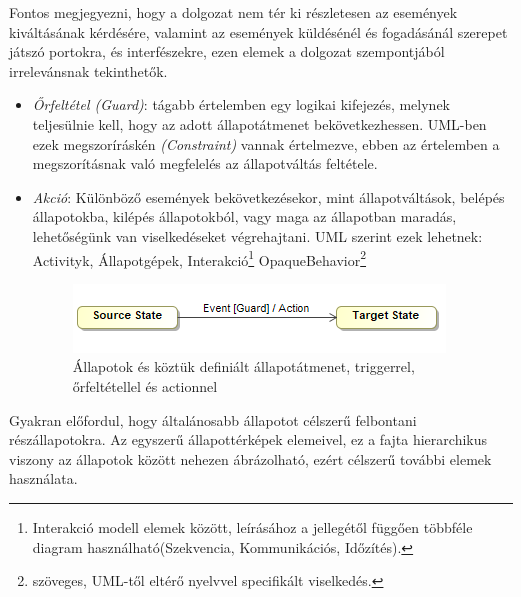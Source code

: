 Fontos megjegyezni, hogy a dolgozat nem tér ki részletesen az események kiváltásának kérdésére, valamint az események küldésénél és fogadásánál szerepet játszó portokra, és interfészekre, ezen elemek a dolgozat szempontjából irrelevánsnak tekinthetők.
\begin{itemize}
	\item\label{sec:guard} \emph{Őrfeltétel (Guard)}: tágabb értelemben egy logikai kifejezés, melynek teljesülnie kell, hogy az adott állapotátmenet bekövetkezhessen. UML-ben ezek megszoríráskén \emph{(Constraint)} vannak értelmezve, ebben az értelemben a megszorításnak való megfelelés az állapotváltás feltétele.
	\item \emph{Akció}: Különböző események bekövetkezésekor, mint állapotváltások, belépés állapotokba, kilépés állapotokból, vagy maga az állapotban maradás, lehetőségünk van viselkedéseket végrehajtani. UML szerint ezek lehetnek: Activityk, Állapotgépek, Interakció\footnote{Interakció modell elemek között, leírásához a jellegétől függően többféle diagram használható(Szekvencia, Kommunikációs, Időzítés).} OpaqueBehavior\footnote{ szöveges, UML-től eltérő nyelvvel specifikált viselkedés.}
	
	\begin{figure}[!ht]
		\centering
		\includegraphics[keepaspectratio]{figures/statechart_elements/states.png}
		\caption{Állapotok és köztük definiált állapotátmenet, triggerrel, őrfeltétellel és actionnel}
	\end{figure}
\end{itemize}
Gyakran előfordul, hogy általánosabb állapotot célszerű felbontani részállapotokra. Az egyszerű állapottérképek elemeivel, ez a fajta hierarchikus viszony az állapotok között nehezen ábrázolható, ezért célszerű további elemek használata.
